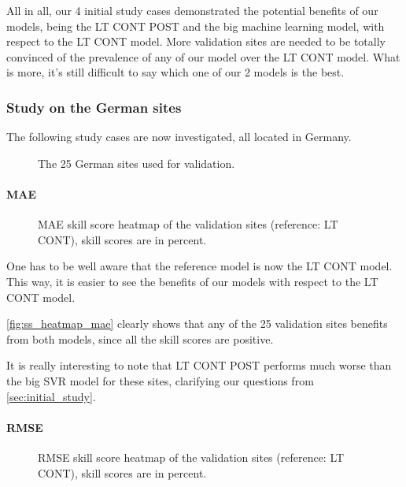 All in all, our 4 initial study cases demonstrated the potential benefits of our models, being the LT CONT POST and the big machine learning model, with respect to the LT CONT model.
More validation sites are needed to be totally convinced of the prevalence of any of our model over the LT CONT model.
What is more, it's still difficult to say which one of our 2 models is the best.

\subsubsection{Study on the German sites}

The following study cases are now investigated, all located in Germany.
\begin{figure}[htb!]
    \centering
    
\caption{The 25 German sites used for validation.}

\end{figure}
\paragraph{MAE}
\begin{figure}[htb!]
    \centering
    
\caption{MAE skill score heatmap of the validation sites (reference: LT CONT), skill scores are in percent.}
\label{fig:ss_heatmap_mae}
\end{figure}

One has to be well aware that the reference model is now the LT CONT model. This way, it is easier to see the benefits of our models with respect to the LT CONT model.

\autoref{fig:ss_heatmap_mae} clearly shows that any of the 25 validation sites benefits from both models, since all the skill scores are positive.

It is really interesting to note that LT CONT POST performs much worse than the big SVR model for these sites, clarifying our questions from \autoref{sec:initial_study}.

\paragraph{RMSE}
\begin{figure}[htb!]
    \centering
    
\caption{RMSE skill score heatmap of the validation sites (reference: LT CONT), skill scores are in percent.}
\end{figure}

